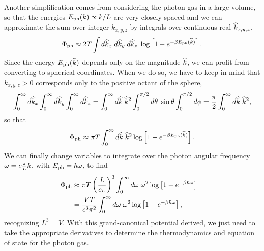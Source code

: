Another simplification comes from considering the photon gas in a large volume, so that the energies $E_{\text{ph}}(k) \propto k / L$ are very closely spaced and we can approximate the sum over integer $k_{x, y, z}$ by integrals over continuous real $\widehat k_{x, y, z}$, %
\begin{equation*}
  \Phi_{\text{ph}} \approx 2T \int d\widehat k_x \; d\widehat k_y \; d\widehat k_z \; \log\left[1 - e^{-\beta E_{\text{ph}}(\widehat k)}\right].
\end{equation*}
Since the energy $E_{\text{ph}}(\widehat k)$ depends only on the magnitude $\widehat k$, we can profit from converting to spherical coordinates.
When we do so, we have to keep in mind that $k_{x, y, z} > 0$ corresponds only to the positive octant of the sphere, %
\begin{equation*}
  \int_0^{\infty} d\widehat k_x \int_0^{\infty} d\widehat k_y \int_0^{\infty} d\widehat k_z = \int_0^{\infty} d\widehat k \; \widehat k^2 \int_0^{\pi / 2} d\theta \; \sin\theta \int_0^{\pi / 2} d\phi = \frac{\pi}{2} \int_0^{\infty} d\widehat k \; \widehat k^2,
\end{equation*}
so that
\begin{equation*}
  \Phi_{\text{ph}} \approx \pi T \int_0^{\infty} d\widehat k \; \widehat k^2 \log\left[1 - e^{-\beta E_{\text{ph}}(\widehat k)}\right].
\end{equation*}
We can finally change variables to integrate over the photon angular frequency $\omega = c \frac{\pi}{L} k$, with $E_{\text{ph}} = \hbar \omega$, to find
\begin{align}
  \Phi_{\text{ph}} & \approx \pi T \left(\frac{L}{c \pi}\right)^3 \int_0^{\infty} d\omega \; \omega^2 \log\left[1 - e^{-\beta \hbar \omega}\right] \cr
                   & = \frac{VT}{c^3 \pi^2} \int_0^{\infty} d\omega \; \omega^2 \log\left[1 - e^{-\beta \hbar \omega}\right], \label{eq:photon_grand}
\end{align}
recognizing $L^3 = V$.
With this grand-canonical potential derived, we just need to take the appropriate derivatives to determine the thermodynamics and equation of state for the photon gas.



